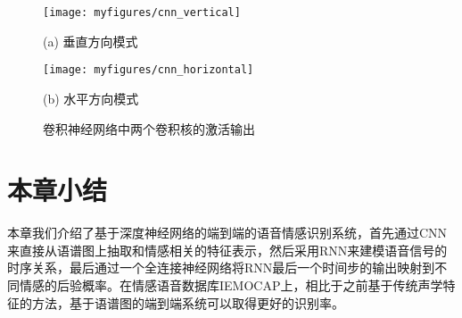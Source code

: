 \begin{figure}[htb]
    \vspace{-0.8cm}  %
    \setlength{\belowcaptionskip}{0cm}   %
    \begin{minipage}{0.48\textwidth}
        \centering
        \texttt{[image: myfigures/cnn\_vertical]}
        \centerline{(a) 垂直方向模式}\medskip
    \end{minipage}\hfill
    \begin{minipage}{0.48\textwidth}
        \centering
        \texttt{[image: myfigures/cnn\_horizontal]}
        \centerline{(b) 水平方向模式}\medskip
    \end{minipage}
\caption{卷积神经网络中两个卷积核的激活输出}
\label{fig:cnn_activation}
\end{figure}

\section{本章小结}
\label{sec:end2end_summary}

本章我们介绍了基于深度神经网络的端到端的语音情感识别系统，首先通过CNN来直接从语谱图上抽取和情感相关的特征表示，然后采用RNN来建模语音信号的时序关系，最后通过一个全连接神经网络将RNN最后一个时间步的输出映射到不同情感的后验概率。在情感语音数据库IEMOCAP上，相比于之前基于传统声学特征的方法，基于语谱图的端到端系统可以取得更好的识别率。